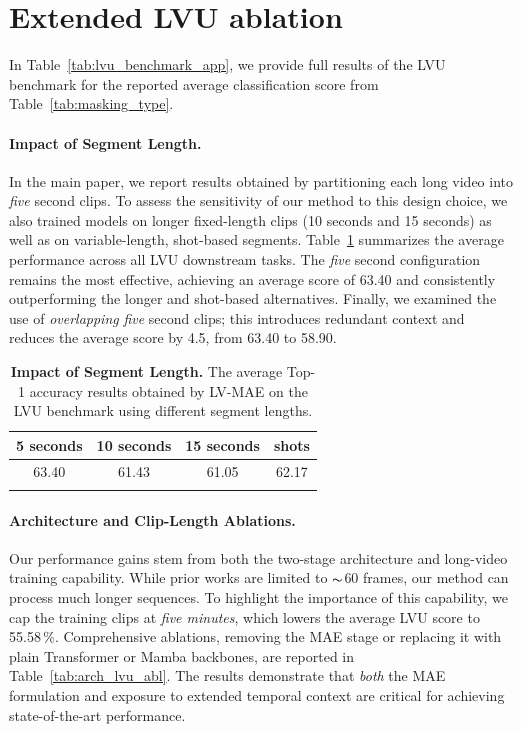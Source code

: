 \section{Extended LVU ablation}
\label{app:extended_lvu_ab}

In Table~\ref{tab:lvu_benchmark_app}, we provide full results of the LVU benchmark for the reported average classification score from Table~\ref {tab:masking_type}.

\paragraph{Impact of Segment Length.}
In the main paper, we report results obtained by partitioning each long
video into \emph{five} second clips.  
To assess the sensitivity of our method to this design choice, we also
trained models on longer fixed-length clips (10 seconds and 15 seconds) as well as
on variable-length, shot-based segments.  
Table~\ref{tab:segment_length} summarizes the average performance across all
LVU downstream tasks. The \emph{five} second configuration remains the most
effective, achieving an average score of 63.40 and consistently
outperforming the longer and shot-based alternatives.
Finally, we examined the use of \emph{overlapping} \emph{five} second clips; this introduces redundant context and reduces the average score by
4.5, from 63.40 to 58.90.


\begin{table}[h]
\centering
\begin{center}
\caption{\textbf{Impact of Segment Length.} The average Top-1 accuracy results obtained by LV-MAE on the LVU benchmark using different segment lengths.}
\begin{tabular}{cccc}
\hline

\hline

\hline
\textbf{5 seconds} & \textbf{10 seconds} & \textbf{15 seconds} & \textbf{shots}\\
\hline
63.40 & 61.43 & 61.05 & 62.17 \\
\hline

\hline

\hline
\label{tab:segment_length}
\end{tabular}
\end{center}
\end{table}

\paragraph{Architecture and Clip-Length Ablations.} Our performance gains stem from both the two-stage architecture and long-video training capability. While prior works are limited to $\thicksim$60 frames, our method can process much longer sequences. To highlight the importance of this capability, we cap the training
clips at \emph{five minutes}, which lowers the average LVU score to
55.58\,\%. Comprehensive ablations, removing the MAE stage or replacing it with plain Transformer or Mamba backbones, are reported in
Table~\ref{tab:arch_lvu_abl}. The results demonstrate that
\emph{both} the MAE formulation and exposure to extended temporal context are critical for achieving state-of-the-art performance.



